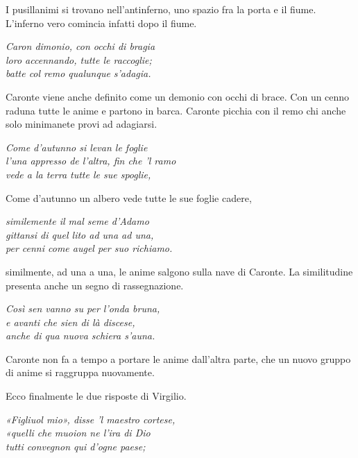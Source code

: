 \documentclass[a4paper]{article}
\newcommand\hr{\par\vspace{-.5\ht\strutbox}\noindent\hrulefill\par\vspace{0.15cm}}
\begin{document}
I pusillanimi si trovano nell'antinferno, uno spazio fra la porta e il fiume.
L'inferno vero comincia infatti dopo il fiume.


\begin{center}
    \textit{Caron dimonio, con occhi di bragia} \\
    \textit{loro accennando, tutte le raccoglie;} \\
    \textit{batte col remo qualunque s'adagia.}
\end{center}

Caronte viene anche definito come un demonio con occhi di brace.
Con un cenno raduna tutte le anime e partono in barca.
Caronte picchia con il remo chi anche solo minimanete provi ad adagiarsi.

\begin{center}
    \textit{Come d'autunno si levan le foglie} \\
    \textit{l'una appresso de l'altra, fin che 'l ramo} \\
    \textit{vede a la terra tutte le sue spoglie,}
\end{center}

Come d'autunno un albero vede tutte le sue foglie cadere,

\begin{center}
    \textit{similemente il mal seme d'Adamo} \\
    \textit{gittansi di quel lito ad una ad una,} \\
    \textit{per cenni come augel per suo richiamo.}
\end{center}

similmente, ad una a una, le anime salgono sulla nave di Caronte.
La similitudine presenta anche un segno di rassegnazione.

\begin{center}
    \textit{Così sen vanno su per l'onda bruna,} \\
    \textit{e avanti che sien di là discese,} \\
    \textit{anche di qua nuova schiera s'auna.}
\end{center}

Caronte non fa a tempo a portare le anime dall'altra parte,
che un nuovo gruppo di anime si raggruppa nuovamente.

\hr

Ecco finalmente le due risposte di Virgilio.

\begin{center}
    \textit{«Figliuol mio», disse 'l maestro cortese,} \\
    \textit{«quelli che muoion ne l'ira di Dio} \\
    \textit{tutti convegnon qui d'ogne paese;}
\end{center}
\end{document}
